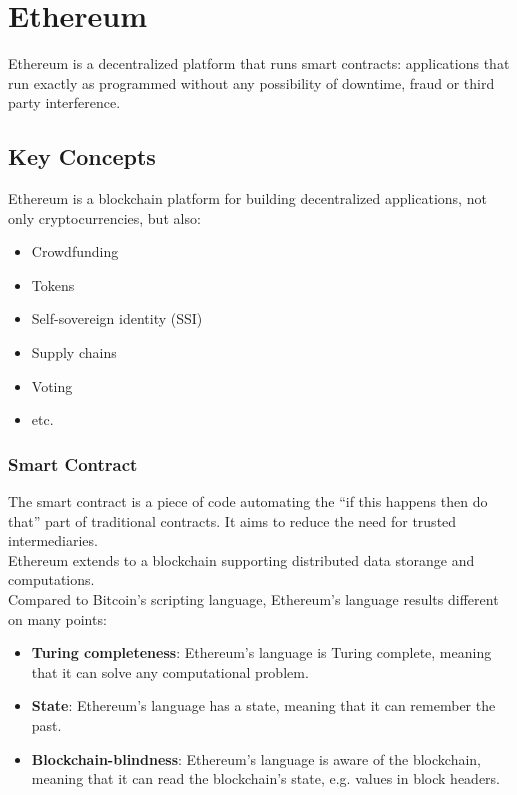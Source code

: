 \chapter{Ethereum}

Ethereum is a decentralized platform that runs smart contracts: applications that run exactly as programmed without any possibility of downtime, fraud or third party interference.
\section{Key Concepts}
Ethereum is a blockchain platform for building decentralized applications, not only cryptocurrencies, but also:
\begin{itemize}
   \item Crowdfunding
   \item Tokens
   \item Self-sovereign identity (SSI)
   \item Supply chains
   \item Voting
   \item etc.
\end{itemize}

\subsection{Smart Contract}


The smart contract is a piece of code automating the ``if this happens then do that'' part of
traditional contracts. It aims to reduce the need for trusted intermediaries.\\
Ethereum extends to a blockchain supporting distributed data storange and computations.\\
Compared to Bitcoin's scripting language, Ethereum's language results different on many points:
\begin{itemize}
   \item \textbf{Turing completeness}: Ethereum's language is Turing complete, meaning that it can solve any computational problem.
   \item \textbf{State}: Ethereum's language has a state, meaning that it can remember the past.
   \item \textbf{Blockchain-blindness}: Ethereum's language is aware of the blockchain, meaning that it can read the blockchain's state, e.g. values in block headers.
\end{itemize} 

